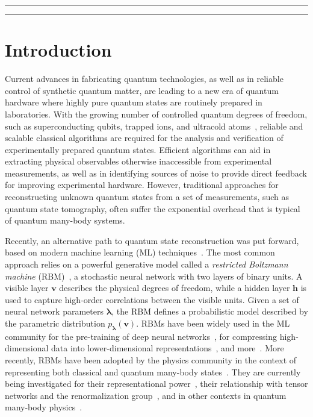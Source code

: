 \documentclass[submission, Phys, hidelnks]{SciPost}
\begin{document}
\noindent\rule{\textwidth}{1pt}
\tableofcontents\thispagestyle{fancy}
\noindent\rule{\textwidth}{1pt}

\section{Introduction}
Current advances in fabricating quantum technologies, as well as in reliable
control of synthetic quantum matter, are leading to a new era of quantum
hardware where highly pure quantum states are routinely prepared in laboratories.
With the growing number of controlled quantum degrees of freedom, such as
superconducting qubits, trapped ions, and ultracold
atoms~\cite{kandala_hardware-efficient_2017,moll_quantum_2018,bernien_probing_2017,zhang_observation_2017}, reliable and scalable
classical algorithms are required for the analysis and verification of
experimentally prepared quantum states. Efficient algorithms can aid in
extracting physical observables otherwise inaccessible from experimental
measurements, as well as in identifying sources of noise to provide direct
feedback for improving experimental hardware. However, traditional approaches
for reconstructing unknown quantum states from a set of measurements, such as
quantum state tomography, often suffer the exponential overhead that is typical
of quantum many-body systems.

Recently, an alternative path to quantum state reconstruction was put forward,
based on modern machine learning (ML)
techniques~\cite{torlai_neural-network_2018,torlai_latent_2018,carrasquilla_reconstructing_2018,lennon_efficiently_2018,kim_mixed_2018}.
The most common approach relies on a powerful generative model called a
\textit{restricted Boltzmann machine} (RBM)~\cite{smolensky_information_1986},
a stochastic neural network with two layers of binary units.
A visible layer $\bm{v}$ describes the physical degrees of freedom, while a
hidden layer $\bm{h}$ is used to capture high-order correlations between the
visible units. Given a set of neural network parameters
 $\bm{\lambda}$, the RBM defines a probabilistic model described by the
 parametric distribution $p_{\bm{\lambda}}(\bm{v})$.
RBMs have been widely used in the ML community for the pre-training of deep
neural networks~\cite{hinton_training_2002}, for compressing high-dimensional
data into lower-dimensional representations~\cite{hinton_reducing_2006}, and
more~\cite{lecun_deep_2015}.
More recently, RBMs have been adopted by the physics community in the context
of representing both classical and quantum many-body
states~\cite{torlai_learning_2016,CarleoTroyer2017Science,carleo_constructing_2018}.
They are currently being investigated for their representational
power~\cite{gao_efficient_2017,choo_symmetries_2018,glasser_neural-network_2018},
their relationship with tensor networks and the renormalization
group~\cite{mehta_exact_2014,koch-janusz_mutual_2018,iso_scale-invariant_2018,lenggenhager_optimal_2018,chen_equivalence_2018},
and in other contexts in quantum many-body physics~\cite{PhysRevB.96.205152,weinstein_neural_2018,RBM_stabilizer}.
\end{document}
